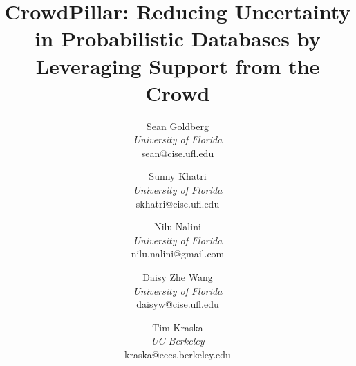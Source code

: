 \documentclass[twocolumn,letter]{vldb}
\title{CrowdPillar: Reducing Uncertainty in Probabilistic Databases by Leveraging Support from the Crowd}
\author{Sean Goldberg\\
	{\it University of Florida}\\
	sean@cise.ufl.edu 
\and 
	Sunny Khatri\\
	{\it University of Florida}\\
	skhatri@cise.ufl.edu 
\and
	Nilu Nalini\\
	{\it University of Florida}\\
	nilu.nalini@gmail.com
\and 
	Daisy Zhe Wang\\
	{\it University of Florida}\\
	daisyw@cise.ufl.edu
\and
	Tim Kraska\\
	{\it UC Berkeley}\\
	kraska@eecs.berkeley.edu}
\begin{document}
\maketitle
















%


\balance
%


\end{document}
